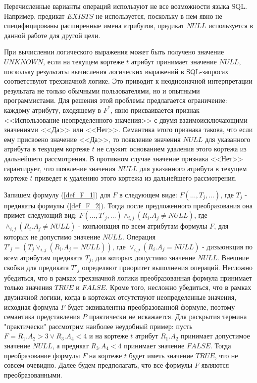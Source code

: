 \documentclass[10pt,a4paper]{article}
\def \n #1{\mathit{#1}}
\begin{document}
Перечисленные варианты операций используют не все возможности языка SQL.
Например, предикат $\n{EXISTS}$ не используется, поскольку в нем явно не
специфицированы расширенные имена атрибутов, предикат $\n{NULL}$ используется
в данной работе для другой цели.

При вычислении логического выражения может быть получено значение $\n{UNKNOWN}$,
если на текущем кортеже $t$ атрибут принимает значение $\n{NULL}$, поскольку
результаты вычисления логических выражений в SQL-запросах соответствуют
трехзначной логике. Это приводит к неоднозначной интерпретации результата не только
обычными пользователями, но и опытными программистами. Для решения этой проблемы
предлагается ограничение: каждому атрибуту, входящему в $F^{\ast}$, явно присваивается признак
<<Использование неопределенного значения>> с двумя взаимоисключающими значениями <<Да>> или <<Нет>>.
Семантика этого признака такова, что если ему присвоено значение <<Да>>, то появление значения $\n{NULL}$
для указанного атрибута в текущем кортеже $t$ не служит основанием удаления этого кортежа из
дальнейшего рассмотрения. В противном случае значение признака <<Нет>> гарантирует, что появление
значения $\n{NULL}$ для указанного атрибута в текущем кортеже $t$ приведет к удалению этого кортежа из
дальнейшего рассмотрения.

Запишем формулу (\ref{def_F_1}) для $F$ в следующем виде: $ F ( \dots, T_j , \dots )$, где $T_j$ - предикаты
формулы (\ref{def_F_2}). Тогда после предложенного преобразования она примет следующий вид:
$F( \dots, T'_j , \dots )\wedge_{i,j}(R_i .A_j \neq  \n{NULL})$, где  $\wedge_{i,j}(R_i .A_j \neq  \n{NULL})$ - конъюнкция
по всем атрибутам формулы $F$, для которых не допустимо значение $\n{NULL}$.
Операция $T'_j = (T_j \vee_{i,j}(R_i .A_j = \n{NULL}))$, где  $\vee_{i,j}(R_i .A_j = \n{NULL})$ - дизъюнкция
по всем атрибутам предиката $T_j$, для которых допустимо значение $\n{NULL}$. Внешние скобки для предиката
$T'_j$ определяют приоритет выполнения операций. Несложно убедиться, что в рамках трехзначной логики
преобразованная формула принимает только значения $\n{TRUE}$ и $\n{FALSE}$. Кроме того, несложно убедиться,
что в рамках двузначной логики, когда в кортежах отсутствуют неопределенные значения, исходная формула $F$
будет эквивалентна преобразованной формуле, поэтому семантика представления $P$ практически не искажается.
Для раскрытия термина "практически" рассмотрим наиболее неудобный пример: пусть $F = R_1 .A_2 > 3 \vee R_3 .A_4 < 4$
и на кортеже $t$ атрибут $R_1 .A_2$ принимает допустимое значение $\n{NULL}$, а предикат $R_3 .A_4 < 4$ принимает
значение $\n{FALSE}$. Тогда преобразование формулы $F$ на кортеже $t$ будет иметь значение $\n{TRUE}$,
что не совсем очевидно. Далее будем предполагать, что все формулы $F$ являются преобразованными.
\end{document}
